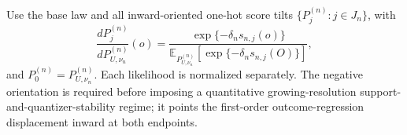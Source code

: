 Use the base law and all inward-oriented one-hot score tilts \(\{P_j^{(n)}:j\in J_n\}\), with
\[
 \frac{dP_j^{(n)}}{dP_{U,\nu_n}^{(n)}}(o)
 =\frac{\exp\{-\delta_n s_{n,j}(o)\}}
 {\mathbb E_{P_{U,\nu_n}^{(n)}}[\exp\{-\delta_n s_{n,j}(O)\}]},
\]
and \(P_0^{(n)}=P_{U,\nu_n}^{(n)}\).  Each likelihood is normalized separately.  The negative orientation is required before imposing a quantitative growing-resolution support-and-quantizer-stability regime; it points the first-order outcome-regression displacement inward at both endpoints.